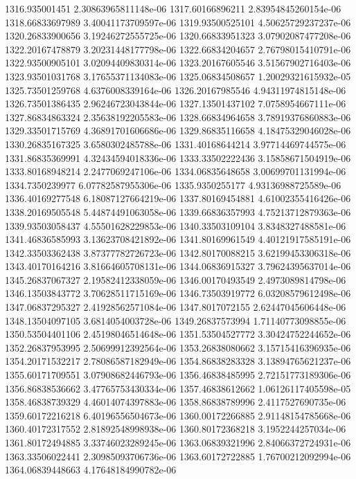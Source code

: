 {1316.935001451 2.30863965811148e-06
1317.60166896211 2.83954845260154e-06
1318.66833697989 3.40041173709597e-06
1319.93500525101 4.50625729237237e-06
1320.26833900656 3.19246272555725e-06
1320.66833951323 3.07902087477208e-06
1322.20167478879 3.20231448177798e-06
1322.66834204657 2.76798015410791e-06
1322.93500905101 3.02094409830314e-06
1323.20167605546 3.51567902716403e-06
1323.93501031768 3.17655371134083e-06
1325.06834508657 1.20029321615932e-05
1325.73501259768 4.6376008339164e-06
1326.20167985546 4.94311974815148e-06
1326.73501386435 2.96246723043844e-06
1327.13501437102 7.0758954667111e-06
1327.86834863324 2.35638192205583e-06
1328.66834964658 3.78919376860883e-06
1329.33501715769 4.36891701606686e-06
1329.86835116658 4.18475329046028e-06
1330.26835167325 3.6580302485788e-06
1331.40168644214 3.97714469744575e-06
1331.86835369991 4.32434594018336e-06
1333.33502222436 3.15858671504919e-06
1333.80168948214 2.2477069247106e-06
1334.06835648658 3.00699701131994e-06
1334.7350239977 6.07782587955306e-06
1335.9350255177 4.93136988725589e-06
1336.40169277548 6.18087127664219e-06
1337.80169454881 4.61002355416426e-06
1338.20169505548 5.44874491063058e-06
1339.66836357993 4.75213712879363e-06
1339.93503058437 4.55501628229853e-06
1340.33503109104 3.8348327488581e-06
1341.46836585993 3.13623708421892e-06
1341.80169961549 4.40121917585191e-06
1342.33503362438 3.87377782726723e-06
1342.80170088215 3.62199453306318e-06
1343.40170164216 3.81664605708131e-06
1344.06836915327 3.79624395637014e-06
1345.26837067327 2.19582412338059e-06
1346.00170493549 2.4973089814798e-06
1346.13503843772 3.70628511715169e-06
1346.73503919772 6.03208579612498e-06
1347.06837295327 2.41928562571084e-06
1347.8017072155 2.62447045606448e-06
1348.13504097105 3.6814054003728e-06
1349.26837573994 1.71140773098855e-06
1350.53504401106 2.45198046514648e-06
1351.53504527772 3.30424752244652e-06
1352.26837953995 2.50699912392564e-06
1353.26838080662 3.15715416396935e-06
1354.20171532217 2.78086587182949e-06
1354.86838283328 3.13894765621237e-06
1355.60171709551 3.07908682446793e-06
1356.46838485995 2.72151773189306e-06
1356.86838536662 3.47765753430334e-06
1357.46838612662 1.06126117405598e-05
1358.46838739329 4.46014074397883e-06
1358.86838789996 2.4117527690735e-06
1359.60172216218 6.40196556504673e-06
1360.00172266885 2.91148154785668e-06
1360.40172317552 2.81892548998938e-06
1360.80172368218 3.1952244257034e-06
1361.80172494885 3.33746023289245e-06
1363.06839321996 2.84066372724931e-06
1363.33506022441 2.30985093706736e-06
1363.60172722885 1.76700212092994e-06
1364.06839448663 4.17648184990782e-06
}
